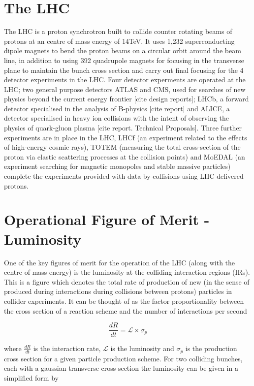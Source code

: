 \section{The LHC}

The LHC is a proton synchrotron built to collide counter rotating beams of protons at an centre of mass energy of 14TeV. It uses 1,232 superconducting dipole magnets to bend the proton beams on a circular orbit around the beam line, in addition to using 392 quadrupole magnets for focusing in the transverse plane to maintain the bunch cross section and carry out final focusing for the 4 detector experiments in the LHC. Four detector experments are operated at the LHC; two general purpose detectors ATLAS and CMS, used for searches of new physics beyond the current energy frontier [cite design reports]; LHCb, a forward detector specialised in the analysis of B-physics [cite report] and ALICE, a detector specialised in heavy ion collisions with the intent of observing the physics of quark-gluon plasma [cite report. Technical Proposals]. Three further experiments are in place in the LHC, LHCf (an experiment related to the effects of high-energy cosmic rays), TOTEM (measuring the total cross-section of the proton via elastic scattering processes at the collision points) and MoEDAL (an experiment searching for magnetic monopoles and stable massive particles) complete the experiments provided with data by collisions using LHC delivered protons.

\section{Operational Figure of Merit - Luminosity}

One of the key figures of merit for the operation of the LHC (along with the centre of mass energy) is the luminosity at the colliding interaction regions (IRs). This is a figure which denotes the total rate of production of new (in the sense of produced during interactions during collisions between protons) particles in collider experiments. It can be thought of as the factor proportionality between the cross section of a reaction scheme and the number of interactions per second

\begin{equation} 
\frac{dR}{dt} = \mathcal{L} \times \sigma_{p}
\end{equation}

where $\frac{dR}{dt}$ is the interaction rate, $\mathcal{L}$ is the luminosity and $\sigma_{p}$ is the production cross section for a given particle production scheme. For two colliding bunches, each with a gaussian transverse cross-section the luminosity can be given in a simplified form by


